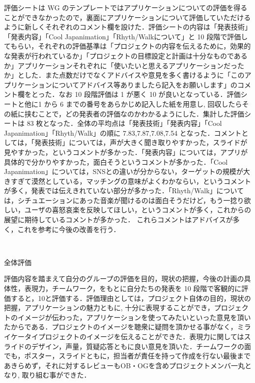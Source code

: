 \begin{enumerate}
評価シートは WG のテンプレートではアプリケーションについての評価を得ることができなかったので，裏面にアプリケーションについて評価していただけるように新しくそれぞれのコメント欄を設けた．評価シートの内容は「発表技術」「発表内容」「Cool Japanimation」「Rhyth/Walkについて」と 10 段階で評価してもらい，それぞれの評価基準は「プロジェクトの内容を伝えるために，効果的な発表が行われているか」「プロジェクトの目標設定と計画は十分なものであるか」アプリケーションそれぞれに「使いたいと思えるアプリケーションだったか」とした．また点数だけでなくアドバイスや意見を多く書けるように「このアプリケーションについてアドバイス等ありましたら記入をお願いします」のコメント欄をとった．なお 10 段階評価は 1 が悪く 10 が良いとなっている．評価シートと他に1 から 6 までの番号をあらかじめ記入した紙を用意し, 回収したらその紙に挟むことで，どの発表者の評価なのかわかるようにした．集計した評価シートは 83 枚となった．全体の平均点は「発表技術」「発表内容」「Cool Japanimation」「Rhyth/Walk」の順に 7.83,7.87,7.08,7.54 となった．コメントとしては，「発表技術」については，声が大きく聞き取りやすかった，スライドが見やすかった，というコメントが多かった．「発表内容」については，アプリが具体的で分かりやすかった，面白そうというコメントが多かった．「Cool Japanimation」については，SNSとの違いが分からない，ターゲットの規模が大きすぎて漠然としている，マッチングの意味がよくわかならい，というコメントが多く，発表では伝えきれていない部分が多かった．「Rhyth/Walk」については，シチュエーションにあった音楽が聞けるのは面白そうだけど，もう一捻り欲しい，ユーザの喜怒哀楽を反映してほしい，というコメントが多く，これからの展望に期待しているコメントが多かった．
これらコメントはアドバイスが多く，これを参考に今後の改善を行う．


\end{enumerate}　
\par
全体評価
\par

評価内容を踏まえて自分のグループの評価を目的，現状の把握，今後の計画の具体性，表現力，チームワーク，をもとに自分たちの発表を 10 段階で客観的に評価すると，10と評価する．評価理由としては，プロジェクト自体の目的，現状の把握，アプリケーションの魅力ともに, 十分に表現することができ，プロジェクトのイメージが伝わった，アプリケーションを使ってみたいといった意見を頂いたからである．プロジェクトのイメージを聴衆に疑問を頂かせる事がなく，ミライケータイプロジェクトのイメージを伝えることができた．表現力に関してはスライドのデザイン，声量，質疑応答ともに良い意見を頂いた．チームワークの面でも，ポスター，スライドともに，担当者が責任を持って作成を行ない最後まであきらめず，それに対するレビューもOB・OGを含めプロジェクトメンバ一丸となり, 取り組む事ができた．

